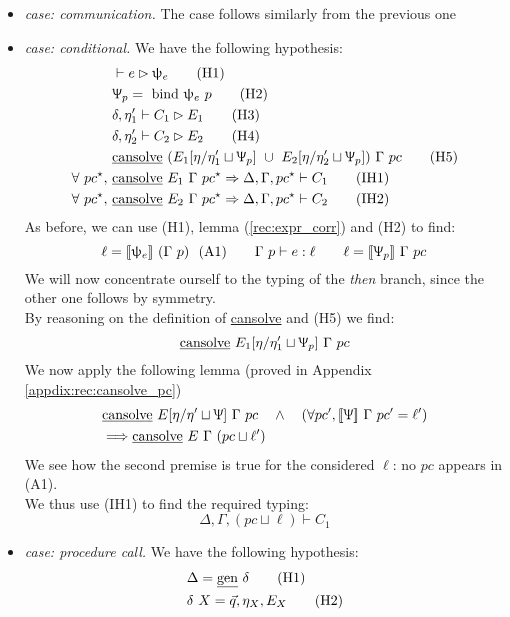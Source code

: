 \documentclass[12pt,a4paper,twoside]{book}
\newcommand{\llbracket}{[\![}
\newcommand{\rrbracket}{]\!]}
\begin{document}
\begin{itemize}
\item\emph{case: communication.} The case follows similarly from the previous one
\item\emph{case: conditional.} We have the following hypothesis:
\begin{align}
&\vdash e \rhd \uppsi_e \tag{H1}\\
&\Uppsi_p =~\text{bind}~\uppsi_e~p\tag{H2}\\
&\delta, \eta_1' \vdash C_1 \rhd E_1 \tag{H3}\\
&\delta, \eta_2' \vdash C_2 \rhd E_2 \tag{H4}\\
&\text{\underline{cansolve}}~(E_1[\eta/\eta_1' \sqcup \Uppsi_p] ~\cup~ E_2[\eta/\eta_2' \sqcup \Uppsi_p])~\Gamma~pc \tag{H5}\\
\forall~pc^\star,~&\text{\underline{cansolve}}~E_1~\Gamma~pc^\star \Rightarrow \Delta, \Gamma, pc^\star \vdash C_1 \tag{IH1}\\
\forall~pc^\star,~&\text{\underline{cansolve}}~E_2~\Gamma~pc^\star \Rightarrow \Delta, \Gamma, pc^\star \vdash C_2 \tag{IH2}
\end{align}
As before, we can use (H1), lemma (\ref{rec:expr_corr}) and (H2) to find:
$$
\ell = \llbracket \uppsi_e \rrbracket~(\Gamma~p)~~(\text{A1})
\quad\quad
\Gamma~p\vdash e:\ell
\quad\quad
\ell = \llbracket \Uppsi_p \rrbracket~\Gamma~pc
$$
We will now concentrate ourself to the typing of the \emph{then} branch, since the other one follows by symmetry.\\
By reasoning on the definition of \underline{cansolve} and (H5) we find:
$$
\text{\underline{cansolve}}~E_1[\eta/\eta_1' \sqcup \Uppsi_p]~\Gamma~pc
$$
We now apply the following lemma (proved in Appendix \ref{appdix:rec:cansolve_pc})
\begin{align*}
&\text{\underline{cansolve}}~E[\eta/\eta' \sqcup \Uppsi]~\Gamma~pc
\quad\land\quad (\forall pc', \llbracket \Uppsi \rrbracket~\Gamma~pc'=\ell')\\
&\Longrightarrow \text{\underline{cansolve}}~E~\Gamma~(pc\sqcup\ell')
\end{align*}
We see how the second premise is true for the considered $\ell$: no $pc$ appears in (A1).\\
We thus use (IH1) to find the required typing:
$$
\Delta, \Gamma, (pc \sqcup \ell) \vdash C_1
$$
\item\emph{case: procedure call.} We have the following hypothesis:
\begin{align*}
	&\Delta = \text{\underline{gen}}~\delta\tag{H1}\\
	&\delta~X = \vec{q}, \eta_X, E_X \tag{H2}\\

\end{align*}
\end{itemize}
\end{document}
